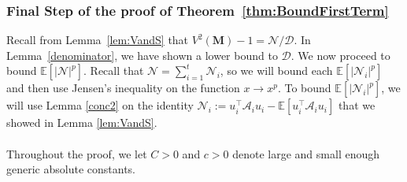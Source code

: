 \documentclass[11pt, reqno,english]{amsart}
\begin{document}
\subsubsection{Final Step of the proof of Theorem~\ref{thm:BoundFirstTerm}}
Recall from Lemma~\ref{lem:VandS} that $V^2(\mathbf{M})-1 = \mathcal{N}/\mathcal{D}$. In Lemma~\ref{denominator}, we have shown a lower bound to $\mathcal{D}$. We now proceed to bound $\mathbb{E}[|\mathcal N|^p]$. Recall that $\mathcal N = \sum_{i = 1}^t \mathcal N_i$, so we will bound each $\mathbb{E}[|\mathcal N_i|^p]$ and then use Jensen's inequality on the function $x \to x^p$. To bound $\mathbb{E}[|\mathcal N_i|^p]$, we will use Lemma \ref{conc2} on the identity $\mathcal N_i := u_i^\top \mathcal A_i u_i - \mathbb{E}[u_i^\top \mathcal A_i u_i]$ that we showed in Lemma \ref{lem:VandS}.
\\\\
Throughout the proof, we let $C> 0$ and $c > 0$ denote large and small enough generic absolute constants.
\end{document}
